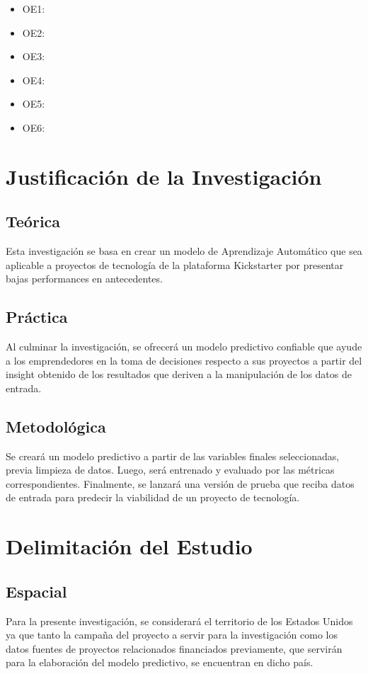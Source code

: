 \begin{itemize}
	\item OE1: {\Objone}
	\item OE2: {\Objtwo}
	\item OE3: {\Objthree}
	\item OE4: {\Objfour}
	\item OE5: {\Objfive}
	\item OE6: {\Objsix}
\end{itemize}

\section{Justificación de la Investigación}

\subsection{Teórica}
Esta investigación se basa en crear un modelo de Aprendizaje Automático que sea aplicable a proyectos de tecnología de la plataforma Kickstarter por presentar bajas performances en antecedentes.

\subsection{Práctica}
Al culminar la investigación, se ofrecerá un modelo predictivo confiable que ayude a los emprendedores en la toma de decisiones respecto a sus proyectos a partir del insight obtenido de los resultados que deriven a la manipulación de los datos de entrada.

\subsection{Metodológica}
Se creará un modelo predictivo a partir de las variables finales seleccionadas, previa limpieza de datos. Luego, será entrenado y evaluado por las métricas correspondientes. Finalmente, se lanzará una versión de prueba que reciba datos de entrada para predecir la viabilidad de un proyecto de tecnología.

\section{Delimitación del Estudio}

\subsection{Espacial}
Para la presente investigación, se considerará el territorio de los Estados Unidos ya que tanto la campaña del proyecto a servir para la investigación como los datos fuentes de proyectos relacionados financiados previamente, que servirán para la elaboración del modelo predictivo, se encuentran en dicho país.

